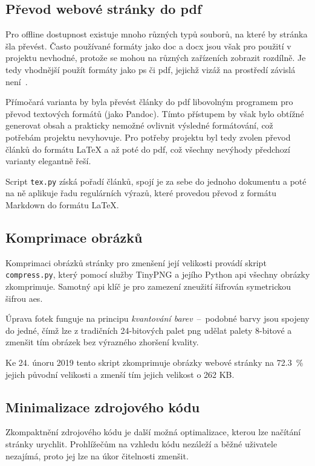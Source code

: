 \documentclass[a4paper, 12pt]{article}
\begin{document}
  \subsection{Převod webové stránky do \acrshort{pdf}} \label{sec:Převod webové stránky do PDF}
  Pro offline dostupnost existuje mnoho různých typů souborů, na které by stránka šla převést. Často používané formáty jako \gls{doc} a \gls{docx} jsou však pro použití v projektu nevhodné, protože se mohou na různých zařízeních zobrazit rozdílně. Je tedy vhodnější použít formáty jako \gls{ps} či \gls{pdf}, jejichž vizáž na prostředí závislá není~\cite{history-of-pdf}.

  Přímočará varianta by byla převést články do \gls{pdf} libovolným programem pro převod textových formátů (jako Pandoc). Tímto přístupem by však bylo obtížné generovat obsah a prakticky nemožné ovlivnit výsledné formátování, což potřebám projektu nevyhovuje. Pro potřeby projektu byl tedy zvolen převod článků do formátu \LaTeX{} a až poté do \gls{pdf}, což všechny nevýhody předchozí varianty elegantně řeší.

  Script \texttt{tex.py} získá pořadí článků, spojí je za sebe do jednoho dokumentu a poté na ně aplikuje řadu regulárních výrazů, které provedou převod z formátu Markdown do formátu \LaTeX.


  \subsection{Komprimace obrázků}
  Komprimaci obrázků stránky pro zmenšení její velikosti provádí skript \texttt{compress.py}, který pomocí služby TinyPNG a jejího Python \gls{api} všechny obrázky zkomprimuje. Samotný \gls{api} klíč je pro zamezení zneužití šifrován symetrickou šifrou \gls{aes}.

  Úprava fotek funguje na principu \emph{kvantování barev}~--~podobné barvy jsou spojeny do jedné, čímž lze z tradičních 24-bitových palet \gls{png} udělat palety 8-bitové a zmenšit tím obrázek bez výrazného zhoršení kvality.

  Ke 24. únoru 2019 tento skript zkomprimuje obrázky webové stránky na \SI{72.3}{\percent} jejich původní velikosti a zmenší tím jejich velikost o \num{262} KB.


  \subsection{Minimalizace zdrojového kódu}
  Zkompaktnění zdrojového kódu je další možná optimalizace, kterou lze načítání stránky urychlit. Prohlížečům na vzhledu kódu nezáleží a běžné uživatele nezajímá, proto jej lze na úkor čitelnosti zmenšit.
\end{document}
